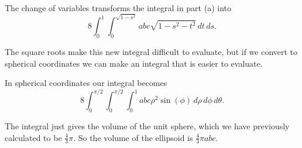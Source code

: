 \begin{exercises}
\begin{exerciseSolution}
		\item The change of variables transforms the integral in part (a) into
\[8\int_{0}^{1} \int_{0}^{\sqrt{1-s^2}} abc\sqrt{1-s^2-t^2}  \, dt \, ds.\]
		\item The square roots make this new integral difficult to evaluate, but if we convert to spherical coordinates we can make an integral that is easier to evaluate. 
		\item In spherical coordinates our integral becomes
\[8 \int_{0}^{\pi/2} \int_{0}^{\pi/2} \int_{0}^{1} abc \rho^2 \sin(\phi) \, d\rho \, d\phi \, d\theta.\]
		\item The integral just gives the volume of the unit sphere, which we have previously calculated to be $\frac{4}{3} \pi$. So the volume of the ellipsoid is $\frac{4}{3}\pi abc$. 
	\ea
\end{exerciseSolution}

\end{exercises}
\afterexercises

